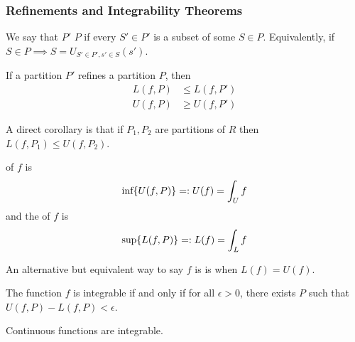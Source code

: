 \documentclass{article}
\numberwithin{equation}{section}
\begin{document}
\subsubsection{Refinements and Integrability Theorems}
\begin{definition}
    We say that $P'$  $P$ if every $S'\in P'$ is a subset of some $S\in P$. Equivalently, if $S\in P \implies S = U_{S'\in P', s'\in S}(s')$.
\end{definition}
\begin{lemma}
    If a partition $P'$ refines a partition $P$, then
    \begin{align}
        L(f,P) &\le L(f,P') \\ 
        U(f,P) &\ge U(f,P')
    \end{align}
\end{lemma}
A direct corollary is that if $P_1,P_2$ are partitions of $R$ then $L(f,P_1) \le U(f,P_2).$
\begin{definition}
     of $f$ is
    \begin{equation}
        \text{inf}\{U(f,P)\} =: U(f) = \int_U f \\ 
    \end{equation}
    and the  of $f$ is
    \begin{equation}
        \text{sup}\{L(f,P)\} =: L(f) = \int_L f \\
    \end{equation}
\end{definition}
An alternative but equivalent way to say $f$ is  is when $L(f)=U(f).$
\begin{theorem}
    The function $f$ is integrable if and only if for all $\epsilon >0$, there exists $P$ such that $U(f,P)-L(f,P) <\epsilon.$
\end{theorem}
\begin{theorem}
    Continuous functions are integrable.
\end{theorem}
\end{document}
